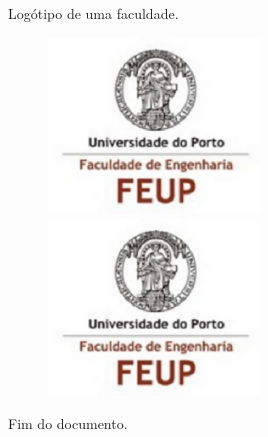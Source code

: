 \documentclass[twoside,a4paper,10pt]{article}
\begin{document}
Logótipo de uma faculdade.
\begin{figure}[!h]
\includegraphics[width=0.5\textwidth]{img.pdf}
\includegraphics[width=0.5\textwidth]{img.pdf}
\end{figure}

Fim do documento.
\end{document}
